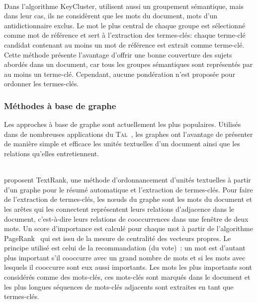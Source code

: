 
        ~\\Dans l'algorithme KeyCluster,  utilisent
        aussi un groupement sémantique, mais dans leur cas, ils ne considèrent
        que les mots du document, mots d'un antidictionnaire exclus. Le mot le
        plus central de chaque groupe est sélectionné comme mot de référence et
        sert à l'extraction des termes-clés: chaque terme-clé candidat contenant
        au moins un mot de référence est extrait comme terme-clé. Cette méthode
        présente l'avantage d'offrir une bonne couverture des sujets abordés
        dans un document, car tous les groupes sémantiques sont représentés par
        au moins un terme-clé. Cependant, aucune pondération n'est proposée pour
        ordonner les termes-clés.


      \subsubsection{Méthodes à base de graphe}
      \label{subsubsec:main-state_of_the_art-automatic_keyphrase_extraction-unsupervised_keyphrase_extraction-graph_based_approaches}
        Les approches à base de graphe sont actuellement les plus populaires.
        Utilisés dans de nombreuses applications du
        \textsc{Tal}~\cite{kozareva2013textgraphs}, les graphes ont l'avantage
        de présenter de manière simple et efficace les unités textuelles d'un
        document ainsi que les relations qu'elles entretiennent.

        ~\\ proposent TextRank, une méthode
        d'ordonnancement d'unités textuelles à partir d'un graphe pour le résumé
        automatique et l'extraction de termes-clés. Pour faire de l'extraction
        de termes-clés, les n\oe{}uds du graphe sont les mots du document et les
        arêtes qui les connectent représentent leurs relations d'adjacence dans
        le document, c'est-à-dire leurs relations de cooccurrences dans une
        fenêtre de deux mots. Un score d'importance est calculé pour chaque mot
        à partir de l'algorithme PageRank~\cite{brin1998pagerank} qui est issu
        de la mesure de centralité des vecteurs propres. Le principe utilisé est
        celui de la recommandation (du vote)~: un mot est d'autant plus
        important s'il cooccurre avec un grand nombre de mots et si les mots
        avec lesquels il cooccurre sont eux aussi importants. Les mots les plus
        importants sont considérés comme des mots-clés, ces mots-clés sont
        marqués dans le document et les plus longues séquences de mots-clés
        adjacents sont extraites en tant que termes-clés.
      
